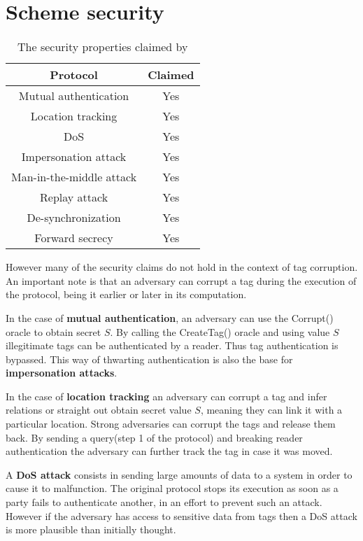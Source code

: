 \section{Scheme security}
\begin{table}[H]
    \centering
    \caption{The security properties claimed by \cite{BOM}}
    \begin{tabular}{| c | c |}
        \hline
        Protocol & Claimed \\
        \hline
        Mutual authentication & Yes \\
        Location tracking & Yes \\
        DoS & Yes \\
        Impersonation attack & Yes  \\
        Man-in-the-middle attack & Yes  \\
        Replay attack & Yes  \\
        De-synchronization & Yes  \\
        Forward secrecy & Yes \\
        \hline
    \end{tabular}
\end{table}

    However many of the security claims do not hold in the context of tag corruption. An important note is that an adversary can corrupt
    a tag during the execution of the protocol, being it earlier or later in its computation.

    In the case of \textbf{mutual authentication}, an adversary can use the Corrupt() oracle to obtain secret $S$. By calling the CreateTag()
    oracle and using value $S$ illegitimate tags can be authenticated by a reader. Thus tag authentication is bypassed.
    This way of thwarting authentication is also the base for \textbf{impersonation attacks}.
    
    In the case of \textbf{location tracking} an adversary can corrupt a tag and infer relations or straight out obtain secret value $S$, meaning
    they can link it with a particular location. Strong adversaries can corrupt the tags and release them back. By sending a query(step 1
    of the protocol) and breaking reader authentication the adversary can further track the tag in case it was moved.

    A \textbf{DoS attack} consists in sending large amounts of data to a system in order to cause it to malfunction. The original protocol
    stops its execution as soon as a party fails to authenticate another, in an effort to prevent such an attack. However if the adversary 
    has access to sensitive data from tags then a DoS attack is more plausible than initially thought.

